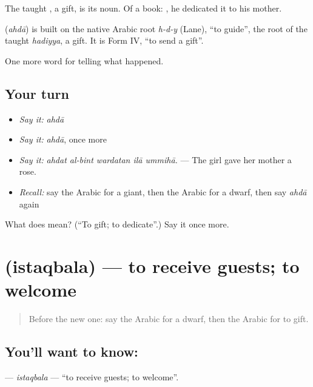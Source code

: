 The taught , a gift, is its noun. Of a book:    , he dedicated it to his mother.

\begin{cousinweb}
\textbf{} (\emph{ahdā}) is built on the native Arabic root \emph{h-d-y} (Lane), \textquotedblleft{}to guide\textquotedblright{}, the root of the taught \emph{hadiyya}, a gift. It is Form IV, \textquotedblleft{}to send a gift\textquotedblright{}.
\end{cousinweb}

\begin{grammarlens}[title={What you've built}]
One more word for telling what happened.
\end{grammarlens}

\subsection*{Your turn}
\begin{itemize}
\raggedright
  \item \emph{Say it:} \emph{ahdā}
  \item \emph{Say it:} \emph{ahdā}, once more
  \item \emph{Say it:} \emph{ahdat al-bint wardatan ilā ummihā.} — The girl gave her mother a rose.
  \item \emph{Recall:} say the Arabic for a giant, then the Arabic for a dwarf, then say \emph{ahdā} again
\end{itemize}

\begin{tcolorbox}[breakable,colback=teal!4,colframe=teal!35!black,title={Before you move on}]
What does  mean? (\textquotedblleft{}To gift; to dedicate\textquotedblright{}.) Say it once more.
\end{tcolorbox}
\section[\texorpdfstring{\ar{استقبل} (istaqbala)}{استقبل (istaqbala)}]{ (istaqbala) — to receive guests; to welcome}

\label{lesson:AR-C336-istaqbala}



\begin{quote}
Before the new one: say the Arabic for a dwarf, then the Arabic for to gift.
\end{quote}

\subsection*{You'll want to know: }
\textbf{} — \emph{istaqbala} — \textquotedblleft{}to receive guests; to welcome\textquotedblright{}.

